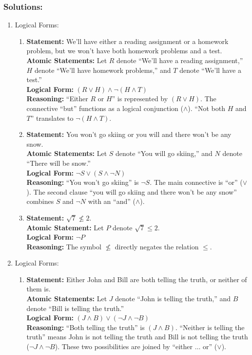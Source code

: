 \subsubsection{Solutions:}
\begin{enumerate}
\item Logical Forms:
  \begin{enumerate}    
  \item \textbf{Statement:} We'll have either a reading assignment or a homework problem, but we won't have both homework problems and a test. \\ 
    \textbf{Atomic Statements: } Let $R$ denote ``We'll have a reading assignment,'' $H$ denote ``We'll have homework problems,'' and $T$ denote ``We'll have a test.'' \\
    \textbf{Logical Form:} $(R \lor H) \land \neg(H \land T)$ \\
    \textbf{Reasoning:} ``Either $R$ or $H$'' is represented by $(R \lor H)$. The connective ``but'' functions as a logical conjunction ($\land$). ``Not both $H$ and $T$'' translates to $\neg(H \land T)$.
    
  \item \textbf{Statement:} You won't go skiing or you will and there won't be any snow. \\
    \textbf{Atomic Statements:} Let $S$ denote ``You will go skiing,'' and $N$ denote ``There will be snow.'' \\
    \textbf{Logical Form:} $\neg S \lor (S \land \neg N)$ \\
    \textbf{Reasoning:} ``You won't go skiing'' is $\neg S$. The main connective is ``or'' ($\lor$). The second clause ``you will go skiing and there won't be any snow'' combines $S$ and $\neg N$ with an ``and'' ($\land$).
    
  \item \textbf{Statement:} $\sqrt{7} \nleq 2$. \\
    \textbf{Atomic Statement:} Let $P$ denote $\sqrt{7} \le 2$. \\
    \textbf{Logical Form:} $\neg P$ \\
    \textbf{Reasoning:} The symbol $\nleq$ directly negates the relation $\le$.
  \end{enumerate}
  
\item Logical Forms:
  \begin{enumerate}
  \item \textbf{Statement:} Either John and Bill are both telling the truth, or neither of them is. \\
    \textbf{Atomic Statements:} Let $J$ denote ``John is telling the truth,'' and $B$ denote ``Bill is telling the truth.'' \\
    \textbf{Logical Form:} $(J \land B) \lor (\neg J \land \neg B)$ \\
    \textbf{Reasoning:} ``Both telling the truth'' is $(J \land B)$. ``Neither is telling the truth'' means John is not telling the truth and Bill is not telling the truth ($\neg J \land \neg B$). These two possibilities are joined by ``either $\dots$ or'' ($\lor$).


\end{enumerate}
\end{enumerate}
